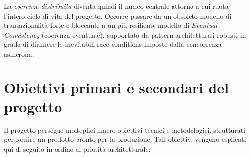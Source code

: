 \documentclass[11pt,a4paper]{report}
\begin{document}
La \textit{coerenza distribuita} diventa quindi il nucleo centrale attorno a cui ruota l'intero ciclo di vita del progetto. Occorre passare da un obsoleto modello di transazionalit\`a forte e bloccante a un pi\`u resiliente modello di \textit{Eventual Consistency} (coerenza eventuale), supportato da pattern architetturali robusti in grado di dirimere le inevitabili race conditions imposte dalla concorrenza asincrona.

\section{Obiettivi primari e secondari del progetto}
Il progetto persegue molteplici macro-obiettivi tecnici e metodologici, strutturati per fornire un prodotto pronto per la produzione. Tali obiettivi vengono esplicati qui di seguito in ordine di priorit\`a architetturale:
\end{document}
